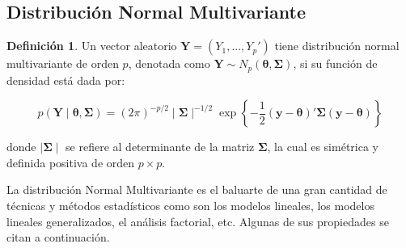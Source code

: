 \documentclass[
  10pt,
  spanish,
]{book}
\theoremstyle{definition}
\newtheorem{definition}{Definición}[chapter]
\theoremstyle{definition}
\theoremstyle{definition}
\theoremstyle{definition}
\theoremstyle{remark}
\begin{document}
\hypertarget{distribuciuxf3n-normal-multivariante}{%
\subsection{Distribución Normal Multivariante}\label{distribuciuxf3n-normal-multivariante}}

\begin{definition}
\protect\hypertarget{def:unnamed-chunk-55}{}{\label{def:unnamed-chunk-55} }Un vector aleatorio \(\mathbf{Y}=(Y_1,\ldots,Y_p')\) tiene distribución normal multivariante de orden \(p\), denotada como \(\mathbf{Y}\sim N_p(\boldsymbol \theta,\boldsymbol \Sigma)\), si su función de densidad está dada por:

\begin{equation}
p(\mathbf{Y} \mid \boldsymbol \theta,\boldsymbol \Sigma)=(2\pi)^{-p/2} \mid \boldsymbol \Sigma\mid ^{-1/2}
\exp\left\{-\frac{1}{2}(\mathbf{y}-\boldsymbol \theta)'\boldsymbol \Sigma(\mathbf{y}-\boldsymbol \theta)\right\}
\end{equation}

donde \(\mid \boldsymbol \Sigma\mid\) se refiere al determinante de la matriz \(\boldsymbol \Sigma\), la cual es simétrica y definida positiva de orden \(p\times p\).
\end{definition}

La distribución Normal Multivariante es el baluarte de una gran cantidad de técnicas y métodos estadísticos como son los modelos lineales, los modelos lineales generalizados, el análisis factorial, etc. Algunas de sus propiedades se citan a continuación.
\end{document}
